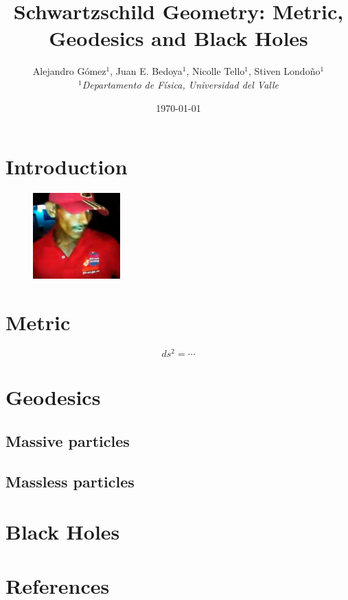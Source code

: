 \documentclass[letterpaper,11pt,onecolumn]{article}
\title{Schwartzschild Geometry: Metric, Geodesics and Black Holes}
\author{ Alejandro Gómez$^1$, Juan E. Bedoya$^1$, Nicolle Tello$^1$, Stiven Londoño$^1$ \\ $^1$\textit{Departamento de Física, Universidad del Valle} }
\date{\today}
\begin{document}
\maketitle

\begin{abstract}
    \lipsum[1]
\end{abstract}


\section{Introduction}\label{intro}

\lipsum[1]

\begin{figure}[h!]
    \centering
    \includegraphics[width=0.3\textwidth]{Report/Images/sample.png}
\end{figure}

\section{Metric}\label{metric}

\lipsum[2]

\begin{equation}
    ds^2 = \cdots
\end{equation}

\section{Geodesics}

\lipsum[2]

\subsection{Massive particles}

\lipsum[3]

\subsection{Massless particles}

\lipsum[3]

\section{Black Holes}

\lipsum[4]

\section{References}
\end{document}
